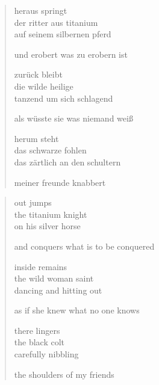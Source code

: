
\cleartoverso


\begin{verse}

heraus springt\\
der ritter aus titanium\\
auf seinem silbernen pferd

und erobert was zu erobern ist

zurück bleibt\\
die wilde heilige\\
tanzend um sich schlagend

als wüsste sie was niemand weiß

herum steht\\
das schwarze fohlen\\
das zärtlich an den schultern

meiner freunde knabbert

\end{verse}

\cleartorecto


\begin{verse}

out jumps\\
the titanium knight\\
on his silver horse

and conquers what is to be conquered

inside remains\\
the wild woman saint\\
dancing and hitting out

as if she knew what no one knows

there lingers\\
the black colt\\
carefully nibbling

the shoulders of my friends

\end{verse}
